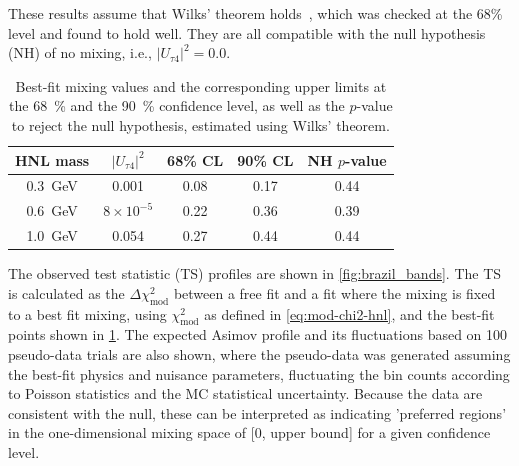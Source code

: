\documentclass[
    aps,
    prd,
    reprint,
    amsmath,
    amssymb,
    nofootinbib,
    superscriptaddress,
    floatfix
]{revtex4-2}
\newcommand{\gev}{\giga\electronvolt}
\def\ut4{$|U_{\tau4}|^2$}
\def\nomathut4{|U_{\tau4}|^2}
\begin{document}
These results assume that Wilks' theorem holds~\cite{wilks_theorem}, which was checked at the 68\% level and found to hold well.
They are all compatible with the null hypothesis (NH) of no mixing, i.e., $\nomathut4=0.0$.
\begin{table}[h]
    \begin{tabular}{ ccccc }
        \hline\hline
       \textbf{HNL mass} & \textbf{\ut4} & \textbf{68\% CL} & \textbf{90\% CL} & \textbf{NH $p$-value}  \\    
       \hline\hline
       \SI{0.3}{\gev} & 0.001 & 0.08 & 0.17  & \SI{0.44}{}\\
        \SI{0.6}{\gev} & $8 \times 10^{-5}$ & 0.22 & 0.36  & \SI{0.39}{}\\
        \SI{1.0}{\gev} & 0.054 & 0.27 & 0.44 & \SI{0.44}{} \\
       \hline
    \end{tabular}
    \caption{Best-fit mixing values and the corresponding upper limits at the \SI{68}{\percent} and the \SI{90}{\percent} confidence level, as well as the $p$-value to reject the null hypothesis, estimated using Wilks' theorem.}
    \label{tab:best_fit_parameters_and_confidence_levels}
\end{table}
The observed test statistic (TS) profiles are shown in \cref{fig:brazil_bands}. The TS is calculated as the $\Delta\chi^2_{\mathrm{mod}}$ between a free fit and a fit where the mixing is fixed to a best fit mixing, using $\chi^2_{\mathrm{mod}}$ as defined in \cref{eq:mod-chi2-hnl}, and the best-fit points shown in \cref{tab:best_fit_parameters_and_confidence_levels}.
The expected Asimov profile and its fluctuations based on 100 pseudo-data trials are also shown, where the pseudo-data was generated assuming the best-fit physics and nuisance parameters, fluctuating the bin counts according to Poisson statistics and the MC statistical uncertainty.
Because the data are consistent with the null, these can be interpreted as indicating 'preferred regions' in the one-dimensional mixing space of [0, upper bound] for a given confidence level.
\end{document}
